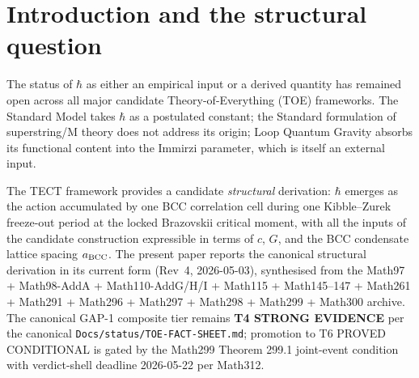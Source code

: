 \begin{abstract}
(Math299 Theorem 299.1, T4 STRONG EVIDENCE currently, T6
PROVED CONDITIONAL upon the joint event $C_1 \wedge C_2 \wedge
C_3$ on continuum precision + sector outcome + boundary-region
absorption). The pre-registered F-GAP1 falsification gate
$|\Delta\hbar/\hbar_{\rm obs}| < 10^{-3}$ at the structural tier
binds the matching residual; the verdict deadline is 2026-05-22 per
Math312. The result establishes the canonical structural formula
and sharpens the GAP-1 verification programme; full GAP-1 composite
closure remains conditional on the joint-event verdict per
Math299. The canonical GAP-1 composite tier as recorded in
\texttt{Docs/status/TOE-FACT-SHEET.md} is currently \textbf{T4
STRONG EVIDENCE}.
\end{abstract}

\maketitle

\section{Introduction and the structural question}\label{sec:intro}

The status of $\hbar$ as either an empirical input or a derived
quantity has remained open across all major candidate
Theory-of-Everything (TOE) frameworks. The Standard Model takes
$\hbar$ as a postulated constant; the Standard formulation of
superstring/M theory does not address its origin; Loop Quantum
Gravity absorbs its functional content into the Immirzi parameter,
which is itself an external input.

The TECT framework provides a candidate \emph{structural} derivation:
$\hbar$ emerges as the action accumulated by one BCC correlation
cell during one Kibble--Zurek freeze-out period at the locked
Brazovskii critical moment, with all the inputs of the candidate
construction expressible in terms of $c$, $G$, and the BCC
condensate lattice spacing $a_{\rm BCC}$. The present paper
reports the canonical structural derivation in its current form
(Rev~4, 2026-05-03), synthesised from the Math97 + Math98-AddA +
Math110-AddG/H/I + Math115 + Math145--147 + Math261 + Math291 +
Math296 + Math297 + Math298 + Math299 + Math300 archive. The
canonical GAP-1 composite tier remains \textbf{T4 STRONG EVIDENCE}
per the canonical \texttt{Docs/status/TOE-FACT-SHEET.md};
promotion to T6 PROVED CONDITIONAL is gated by the
Math299 Theorem 299.1 joint-event condition with verdict-shell
deadline 2026-05-22 per Math312.

